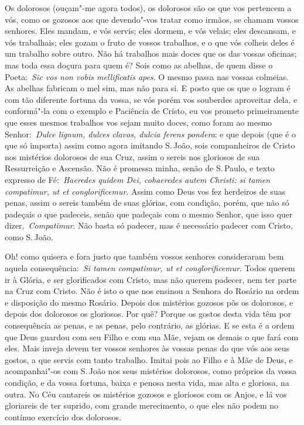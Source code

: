 Os dolorosos (ouçam"-me agora todos), os dolorosos são os
que vos pertencem a vós, como os gozosos aos que devendo"-vos tratar como
irmãos, se chamam vossos senhores. Eles mandam, e vós servis; eles
dormem, e vós velais; eles descansam, e vós trabalhais; eles gozam o
fruto de vossos trabalhos, e o que vós colheis deles é um trabalho sobre
outro. Não há trabalhos mais doces que os das vossas oficinas; mas toda
essa doçura para quem é? Sois como as abelhas, de quem disse o
Poeta:~\emph{Sic vos non vobis mellificatis apes}. O
mesmo passa nas vossas colmeias. As abelhas fabricam o mel sim, mas não
para si. E posto que os que o logram é com tão diferente fortuna da
vossa, se vós porém vos souberdes aproveitar dela, e conformá"-la com o
exemplo e Paciência de Cristo, eu vos prometo primeiramente que esses
mesmos trabalhos vos sejam muito doces, como foram ao mesmo
Senhor:~\emph{Dulce lignum, dulces clavos, dulcia ferens pondera}: e que
depois (que é o que só importa) assim como agora imitando S.\,João, sois
companheiros de Cristo nos mistérios dolorosos de sua Cruz, assim o
sereis nos gloriosos de sua Ressurreição e Ascensão. Não é promessa
minha, senão de S.\,Paulo, e texto expresso de Fé:~\emph{Haeredes quidem
Dei, cohaeredes autem Christi: si tamen compatimur, ut et
conglorificemur}. Assim como Deus vos fez herdeiros de
suas penas, assim o sereis também de suas glórias, com condição, porém,
que não só padeçais o que padeceis, senão que padeçais com o mesmo
Senhor, que isso quer dizer,~\emph{Compatimur}. Não basta só padecer,
mas é necessário padecer com Cristo, como S.\,João.


Oh! como quisera e fora justo que também vossos senhores
consideraram bem aquela consequência:~\emph{Si tamen compatimur, ut et
conglorificemur}. Todos querem ir à Glória, e ser glorificados com
Cristo, mas não querem padecer, nem ter parte na Cruz com Cristo. Não é
isto o que nos ensinou a Senhora do Rosário na ordem e disposição do
mesmo Rosário. Depois dos mistérios gozosos pôs os dolorosos, e depois
dos dolorosos os gloriosos. Por quê? Porque os gostos desta vida têm por
consequência as penas, e as penas, pelo contrário, as glórias. E se esta
é a ordem que Deus guardou com seu Filho e com sua Mãe, vejam os demais
o que fará com eles. Mais inveja devem ter vossos senhores às vossas
penas do que vós aos seus gostos, a que servis com tanto trabalho.
Imitai pois ao Filho e à Mãe de Deus, e acompanhai"-os com S.\,João nos
seus mistérios dolorosos, como próprios da vossa condição, e da vossa
fortuna, baixa e penosa nesta vida, mas alta e gloriosa, na outra. No
Céu cantareis os mistérios gozosos e gloriosos com os Anjos, e lá vos
gloriareis de ter suprido, com grande merecimento, o que eles não podem
no contínuo exercício dos dolorosos.

